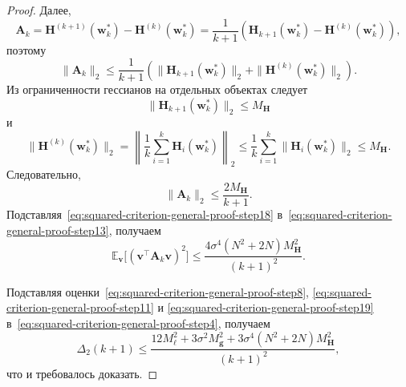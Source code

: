 \begin{proof}
    Далее,
    \begin{equation}
        \label{eq:squared-criterion-general-proof-step14}
        \mathbf A_k
        =
        \mathbf H^{(k+1)}(\mathbf w_k^*)
        -
        \mathbf H^{(k)}(\mathbf w_k^*)
        =
        \frac{1}{k+1}
        \left(
            \mathbf H_{k+1}(\mathbf w_k^*)
            -
            \mathbf H^{(k)}(\mathbf w_k^*)
        \right),
    \end{equation}
    поэтому
    \begin{equation}
        \label{eq:squared-criterion-general-proof-step15}
        \|\mathbf A_k\|_2
        \leqslant
        \frac{1}{k+1}
        \left(
            \|\mathbf H_{k+1}(\mathbf w_k^*)\|_2
            +
            \|\mathbf H^{(k)}(\mathbf w_k^*)\|_2
        \right).
    \end{equation}
    Из ограниченности гессианов на отдельных объектах следует
    \begin{equation}
        \label{eq:squared-criterion-general-proof-step16}
        \|\mathbf H_{k+1}(\mathbf w_k^*)\|_2
        \leqslant
        M_{\mathbf H}
    \end{equation}
    и
    \begin{equation}
        \label{eq:squared-criterion-general-proof-step17}
        \|\mathbf H^{(k)}(\mathbf w_k^*)\|_2
        =
        \left\|
            \frac{1}{k}\sum_{i=1}^k \mathbf H_i(\mathbf w_k^*)
        \right\|_2
        \leqslant
        \frac{1}{k}\sum_{i=1}^k \|\mathbf H_i(\mathbf w_k^*)\|_2
        \leqslant
        M_{\mathbf H}.
    \end{equation}
    Следовательно,
    \begin{equation}
        \label{eq:squared-criterion-general-proof-step18}
        \|\mathbf A_k\|_2
        \leqslant
        \frac{2M_{\mathbf H}}{k+1}.
    \end{equation}
    Подставляя~\eqref{eq:squared-criterion-general-proof-step18}
    в~\eqref{eq:squared-criterion-general-proof-step13}, получаем
    \begin{equation}
        \label{eq:squared-criterion-general-proof-step19}
        \mathbb E_{\mathbf v}
        \big[
            (\mathbf v^\top \mathbf A_k \mathbf v)^2
        \big]
        \leqslant
        \frac{4\sigma^4 (N^2+2N)M_{\mathbf H}^2}{(k+1)^2}.
    \end{equation}

    Подставляя оценки~\eqref{eq:squared-criterion-general-proof-step8},
    \eqref{eq:squared-criterion-general-proof-step11} и
    \eqref{eq:squared-criterion-general-proof-step19}
    в~\eqref{eq:squared-criterion-general-proof-step4}, получаем
    \begin{equation}
        \Delta_2(k+1)
        \leqslant
        \frac{
            12M_\ell^2
            +
            3\sigma^2 M_{\mathbf g}^2
            +
            3\sigma^4 (N^2+2N)M_{\mathbf H}^2
        }{(k+1)^2},
    \end{equation}
    что и требовалось доказать.
\end{proof}

